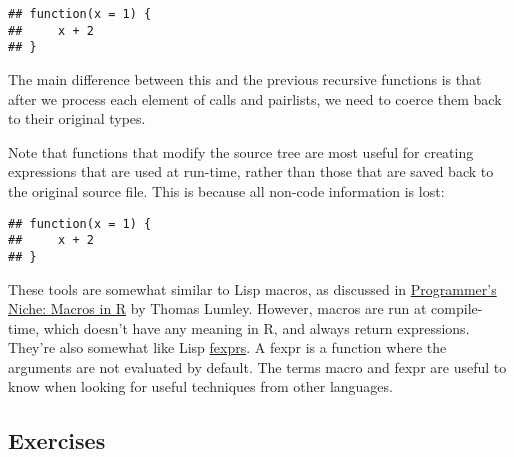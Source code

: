 \begin{Shaded}
\begin{Highlighting}[]
\NormalTok{(}\NormalTok{(}\NormalTok{(}
\OperatorTok{+}\StringTok{ }
\NormalTok{\}))}
\end{Highlighting}
\end{Shaded}

\begin{verbatim}
## function(x = 1) {
##     x + 2
## }
\end{verbatim}

The main difference between this and the previous recursive functions is
that after we process each element of calls and pairlists, we need to
coerce them back to their original types.

Note that functions that modify the source tree are most useful for
creating expressions that are used at run-time, rather than those that
are saved back to the original source file. This is because all non-code
information is lost:

\begin{Shaded}
\begin{Highlighting}[]
\NormalTok{(}\NormalTok{(}\NormalTok{(}
\OperatorTok{+}\StringTok{  }
\StringTok{    }
\NormalTok{\}))}
\end{Highlighting}
\end{Shaded}

\begin{verbatim}
## function(x = 1) {
##     x + 2
## }
\end{verbatim}

These tools are somewhat similar to Lisp macros, as discussed in
\href{http://www.r-project.org/doc/Rnews/Rnews_2001-3.pdf\#page=10}{Programmer's
Niche: Macros in R} by Thomas Lumley. However, macros are run at
compile-time, which doesn't have any meaning in R, and always return
expressions. They're also somewhat like Lisp
\href{http://en.wikipedia.org/wiki/Fexpr}{fexprs}. A fexpr is a function
where the arguments are not evaluated by default. The terms macro and
fexpr are useful to know when looking for useful techniques from other
languages.  

\hypertarget{exercises-6}{%
\subsection{Exercises}\label{exercises-6}}

